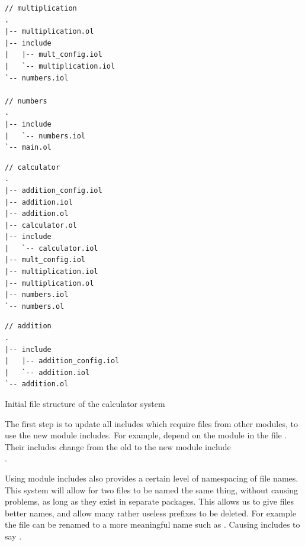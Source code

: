 \begin{listing}[H]

\begin{multicols}{3}

\begin{verbatim}
// multiplication
.
|-- multiplication.ol
|-- include
|   |-- mult_config.iol
|   `-- multiplication.iol
`-- numbers.iol

// numbers
.
|-- include
|   `-- numbers.iol
`-- main.ol
\end{verbatim}

\columnbreak

\begin{verbatim}
// calculator
.
|-- addition_config.iol
|-- addition.iol
|-- addition.ol
|-- calculator.ol
|-- include
|   `-- calculator.iol
|-- mult_config.iol
|-- multiplication.iol
|-- multiplication.ol
|-- numbers.iol
`-- numbers.ol
\end{verbatim}

\columnbreak

\begin{verbatim}
// addition
.
|-- include
|   |-- addition_config.iol
|   `-- addition.iol
`-- addition.ol
\end{verbatim}

\end{multicols}

\caption{Initial file structure of the calculator system}
\label{lst:start_file_structure}
\end{listing}

The first step is to update all includes which require files from other
modules, to use the new module includes. For example, 
depend on the module  in the file
. Their includes change from the old  to the new module include \\.

Using module includes also provides a certain level of namespacing of file
names. This system will allow for two files to be named the same thing, without
causing problems, as long as they exist in separate packages. This allows us to
give files better names, and allow many rather useless prefixes to be deleted.
For example the file  can be renamed to a more meaningful
name such as . Causing includes to say .

